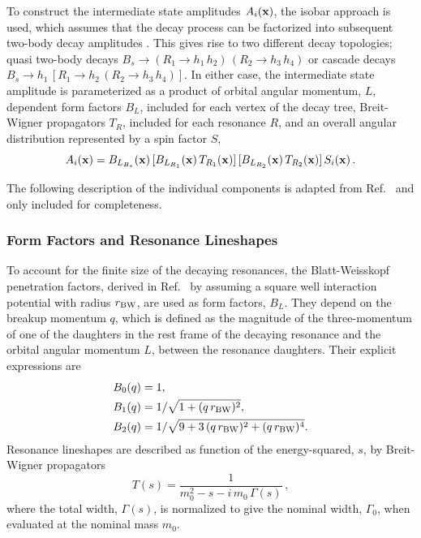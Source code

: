 To construct the intermediate state amplitudes $A_{i}(\mathbf{x} )$,
the isobar approach is used, which 
assumes that
the decay process can be factorized into subsequent two-body decay amplitudes \cite{isobar1,isobar,isobar2}.
This gives rise to two different decay topologies;
quasi two-body decays
$B_s \to (R_{1} \to h_{1}\,h_{2}) \, (R_{2} \to h_{3}\,h_{4})$ 
or cascade decays
$B_s \to h_{1} \, \left[R_{1} \to h_{2} \,  (R_{2} \to h_{3} \, h_{4}) \right]$.
In either case, the intermediate state amplitude is parameterized as a product of
orbital angular momentum, $L$, dependent 
form factors $B_{L}$, included for each vertex of the decay tree, 
Breit-Wigner propagators $T_{R}$,  included for each resonance $R$,
and an overall angular distribution represented by a spin factor $S$,
\begin{equation}
	A_{i}(\mathbf{x} ) =  B_{L_{B_s}}(\bold x) \, [B_{L_{R_{1}}}(\mathbf{x} )  \, T_{R_{1}}(\mathbf{x} )] \, [B_{L_{R_{2}}}(\mathbf{x} ) \, T_{R_{2}}(\mathbf{x} )]  \,  S_{i}(\mathbf{x} )  \, .
	\label{eq:amp4}
\end{equation}

The following description of the individual components is adapted from Ref.~\cite{dArgent:2017gzv} 
and only included for completeness.

\subsubsection{Form Factors and Resonance Lineshapes}
\label{ssec:lineshapes}

To account for the finite size of the decaying resonances,
the Blatt-Weisskopf penetration factors, 
derived in Ref.~\cite{Bl2}
by assuming a square well interaction potential with radius $r_{\rm BW}$,
are used as form factors, $B_L$.
They depend on
the breakup momentum $q$, which is defined as the magnitude of the three-momentum of one of the daughters in the rest frame of the decaying resonance
and the orbital angular momentum $L$, between the resonance daughters.
Their explicit expressions are
\begin{align}
         \nonumber
	B_{0}(q)  &= 1 ,  \\ \nonumber
	B_{1}(q)  &= 1 / \sqrt{{1+ (q \, r_{\rm BW})^{2}}} ,  \\
	B_{2}(q)  &= 1 / \sqrt{9+3\,(q \, r_{\rm BW})^{2}+(q \, r_{\rm BW})^{4}} . 
\end{align}
Resonance lineshapes
are described as function of the energy-squared, $s$, by Breit-Wigner propagators
\begin{equation}
	T(s) = \frac{1}
	{m_0^{2} - s - i\,m_{0}\,\Gamma(s)}   \, ,
	\label{eq:BW}
\end{equation}
where the total width, $\Gamma(s)$, is normalized to give the nominal width, $\Gamma_{0}$, when evaluated at the nominal mass $m_{0}$.

